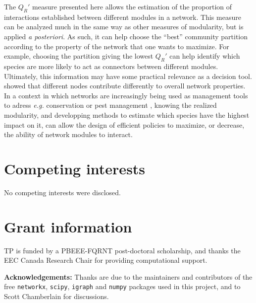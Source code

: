 \documentclass[12pt,oneside]{article}
\begin{document}
The $Q_R'$ measure presented here allows the estimation of the proportion of
interactions established between different modules in a network. This measure
can be analyzed much in the same way as other measures of modularity, but is
applied \emph{a posteriori}. As such, it can help choose the ``best''
community partition according to the property of the network that one wants to
maximize. For example, choosing the partition giving the lowest $Q_R'$ can help
identify which species are more likely to act as connectors between different
modules. Ultimately, this information may have some practical relevance as a
decision tool. \textcite{saavedra_strong_2011} showed that different nodes
contribute differently to overall network properties. In a context in which
networks are increasingly being used as management tools to adress \emph{e.g.}
conservation or pest management \cite{chades_general_2011}, knowing the
realized modularity, and developping methods to estimate which species have the
highest impact on it, can allow the design of efficient policies to maximize, or
decrease, the ability of network modules to interact.

\section*{Competing interests}

No competing interests were disclosed.

\section*{Grant information}

TP is funded by a PBEEE-FQRNT post-doctoral scholarship, and thanks the EEC
Canada Research Chair for providing computational support.

\textbf{Acknowledgements:} Thanks are due to the maintainers and
contributors of the free \texttt{networkx}, \texttt{scipy}, \texttt{igraph}
and \texttt{numpy} packages used in this project, and to Scott Chamberlain
for discussions.

\printbibliography
\end{document}
